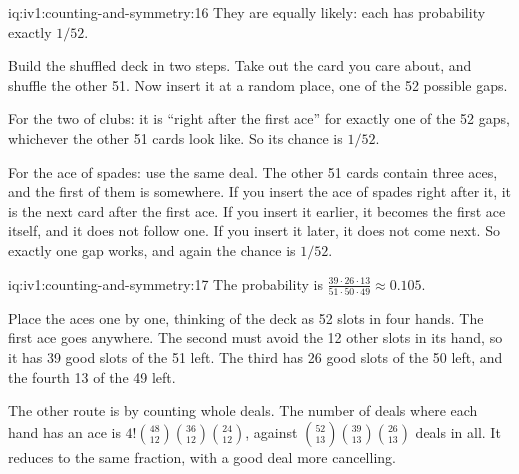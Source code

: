 \begin{solution}{iq:iv1:counting-and-symmetry:16}
They are equally likely: each has probability exactly $1/52$.

Build the shuffled deck in two steps. Take out the card you care about, and shuffle the other 51. Now insert it at a random place, one of the 52 possible gaps.

For the two of clubs: it is ``right after the first ace'' for exactly one of the 52 gaps, whichever the other 51 cards look like. So its chance is $1/52$.

For the ace of spades: use the same deal. The other 51 cards contain three aces, and the first of them is somewhere. If you insert the ace of spades right after it, it is the next card after the first ace. If you insert it earlier, it becomes the first ace itself, and it does not follow one. If you insert it later, it does not come next. So exactly one gap works, and again the chance is $1/52$.

\end{solution}

\begin{solution}{iq:iv1:counting-and-symmetry:17}
The probability is $\frac{39 \cdot 26 \cdot 13}{51 \cdot 50 \cdot 49} \approx 0.105$.

Place the aces one by one, thinking of the deck as 52 slots in four hands. The first ace goes anywhere. The second must avoid the 12 other slots in its hand, so it has 39 good slots of the 51 left. The third has 26 good slots of the 50 left, and the fourth 13 of the 49 left.

The other route is by counting whole deals. The number of deals where each hand has an ace is $4!\binom{48}{12}\binom{36}{12}\binom{24}{12}$, against $\binom{52}{13}\binom{39}{13}\binom{26}{13}$ deals in all. It reduces to the same fraction, with a good deal more cancelling.

\end{solution}

